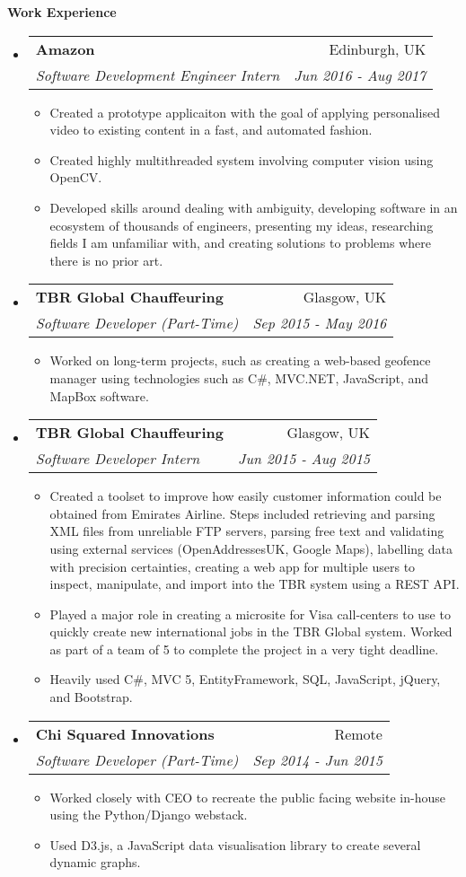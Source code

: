 \documentclass[letterpaper,11pt]{article}
\makeatletter
\newcommand{\resitem}[1]{\item #1 \vspace{-2pt}}
\newcommand{\resheading}[1]{{\large \colorbox{mygrey}{\begin{minipage}{\textwidth}{\textbf{#1 \vphantom{p\^{E}}}}\end{minipage}}}}
\newcommand{\ressubheading}[4]{
\begin{tabular*}{7.0in}{l@{\extracolsep{\fill}}r}
	\textbf{#1} & #2 \\
	\textit{#3} & \textit{#4} \\
\end{tabular*}\vspace{-6pt}}
\makeatother
\begin{document}
	\resheading{Work Experience}
	\begin{itemize}
		\item
		\ressubheading{Amazon}{Edinburgh, UK}{Software Development Engineer Intern}{Jun 2016 - Aug 2017}
		\begin{itemize}
			\resitem{Created a prototype applicaiton with the goal of applying personalised video to existing content in a fast,
			and automated fashion.}
			\resitem{Created highly multithreaded system involving computer vision using OpenCV.}
			\resitem{Developed skills around dealing with ambiguity, developing software in an ecosystem of thousands of engineers,
			presenting my ideas, researching fields I am unfamiliar with, and creating solutions to problems where there is no prior art.}
		\end{itemize}

		\item
		\ressubheading{TBR Global Chauffeuring}{Glasgow, UK}{Software Developer (Part-Time)}{Sep 2015 - May 2016}
		\begin{itemize}
			\resitem{Worked on long-term projects, such as creating a web-based geofence manager using technologies such as
			C\#, MVC.NET, JavaScript, and MapBox software.}
		\end{itemize}

		\item
		\ressubheading{TBR Global Chauffeuring}{Glasgow, UK}{Software Developer Intern}{Jun 2015 - Aug 2015}
		\begin{itemize}
			\resitem{Created a toolset to improve how easily customer information could be obtained from Emirates Airline.
			Steps included retrieving and parsing XML files from unreliable FTP servers, parsing free text and validating
			using external services (OpenAddressesUK, Google Maps), labelling data with precision certainties, creating
			a web app for multiple users to inspect, manipulate, and import into the TBR system using a REST API.}
			\resitem {Played a major role in creating a microsite for Visa call-centers to use to quickly create new international
			jobs in the TBR Global system. Worked as part of a team of 5 to complete the project in a very tight deadline.}
			\resitem {Heavily used C\#, MVC 5, EntityFramework, SQL, JavaScript, jQuery, and Bootstrap.}
		\end{itemize}

		\item
		\ressubheading{Chi Squared Innovations}{Remote}{Software Developer (Part-Time)}{Sep 2014 - Jun 2015}
		\begin{itemize}
			\resitem {Worked closely with CEO to recreate the public facing website in-house using the Python/Django webstack.}
			\resitem {Used D3.js, a JavaScript data visualisation library to create several dynamic graphs.}
		\end{itemize}

	\end{itemize}
\end{document}
